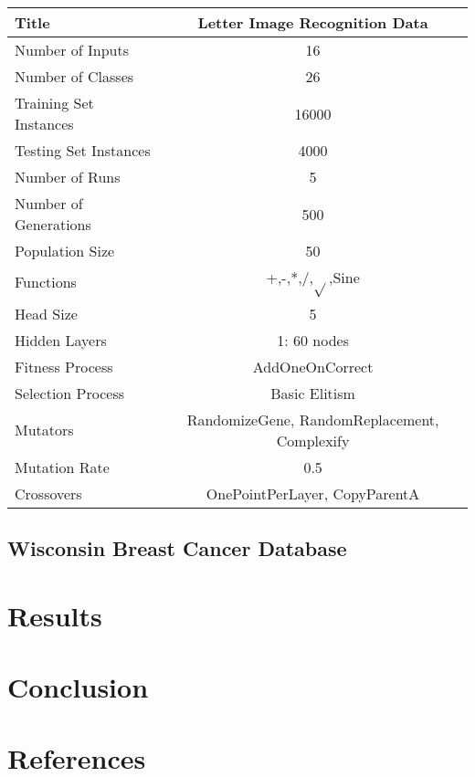 \documentclass[a4paper,11pt]{report}
\begin{document}
\begin{tabular}{| l | c |}
 \hline
 Title & Letter Image Recognition Data \\
 \hline
 Number of Inputs & 16 \\
 Number of Classes & 26 \\
 Training Set Instances & 16000 \\
 Testing Set Instances & 4000 \\
 Number of Runs & 5 \\
 Number of Generations & 500 \\
 Population Size & 50 \\
 Functions & +,-,*,/,$\sqrt{}$,Sine \\
 Head Size & 5 \\
 Hidden Layers & 1: 60 nodes \\
 Fitness Process & AddOneOnCorrect \\
 Selection Process & Basic Elitism \\
 Mutators & RandomizeGene, RandomReplacement, Complexify \\
 Mutation Rate & 0.5 \\
 Crossovers & OnePointPerLayer, CopyParentA \\ 
 \hline
\end{tabular}

\section{Wisconsin Breast Cancer Database}







\chapter{Results}




\chapter{Conclusion}


\chapter{References}

\end{document}
